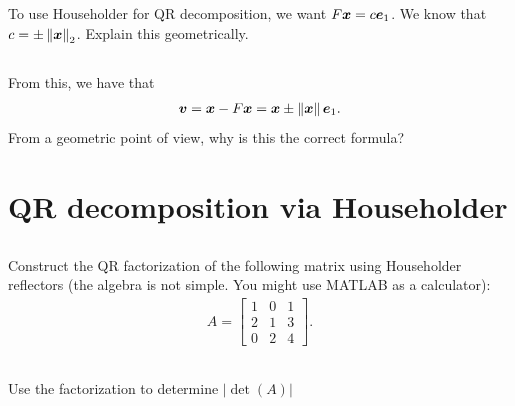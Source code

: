 \documentclass[11pt,letterpaper]{report}
\begin{document}
\subsection{}
To use Householder for QR decomposition, we want $F\boldsymbol{x} = c\boldsymbol{e}_1$. We know that $c = \pm\left\Vert \boldsymbol{x} \right\Vert_2$. Explain this geometrically.

\subsection{}
From this, we have that
\begin{align*}
    \boldsymbol{v} = \boldsymbol{x}- F\boldsymbol{x} =  \boldsymbol{x} \pm \left\Vert \boldsymbol{x} \right\Vert\boldsymbol{e}_1.
\end{align*}
From a geometric point of view, why is this the correct formula?

\section{QR decomposition via Householder}
\subsection{}
Construct the QR factorization of the following matrix
  using Householder reflectors (the algebra is not simple. You might use MATLAB as a calculator):
\begin{align*}
{A} = 
\begin{bmatrix}
1 & 0 & 1 \\
2 & 1 & 3 \\
0 & 2 & 4
\end{bmatrix}.
\end{align*}
\subsection{}
Use the factorization to determine $|\det(A)|$
\end{document}
